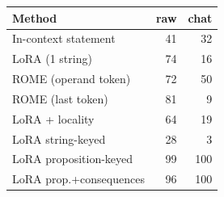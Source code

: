 \begin{tabular}{lrr}
\toprule
Method & raw & chat \\
\midrule
In-context statement & 41 & 32 \\
LoRA (1 string) & 74 & 16 \\
ROME (operand token) & 72 & 50 \\
ROME (last token) & 81 & 9 \\
LoRA + locality & 64 & 19 \\
LoRA string-keyed & 28 & 3 \\
LoRA proposition-keyed & 99 & 100 \\
LoRA prop.+consequences & 96 & 100 \\
\bottomrule
\end{tabular}
